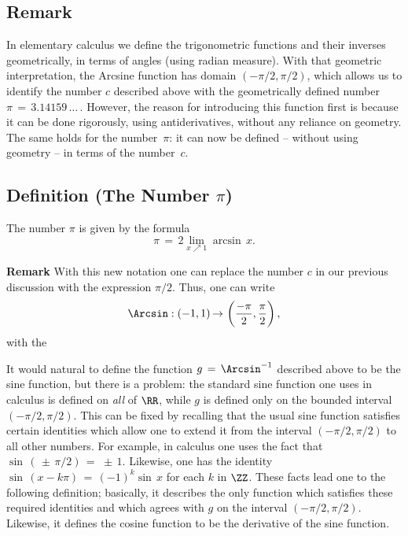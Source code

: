 \VV

             \subsection{\small{\bf Remark}}
            \label{RemrkE45.128AA}

\V

        In elementary calculus we define the trigonometric functions and their inverses geometrically, in terms of angles (using radian measure).
    With that geometric interpretation, the Arcsine function has domain $(-{\pi}/2, {\pi}/2)$,
    which allows us to identify the number $c$ described above with the geometrically defined number~${\pi} \,=\, 3.14159\,{\ldots}\,$.
    However, the reason for introducing this function first is because it can be done rigorously, using antiderivatives, without any reliance on geometry.
    The same holds for the number~${\pi}$: it can now be defined -- without using geometry -- in terms of the number~$c$.

\V

             \subsection{\small{\bf Definition} (The Number ${\pi}$)}
            \label{DefE45.128AAA}

        The number ${\pi}$ is given by the formula
        \begin{equation}
        \label{EqnE.84}
        {\pi} \,=\, 2\lim_{x {\nearrow}1} {\arcsin}\,x.
        \end{equation}

\V

        {\bf Remark} With this new notation one can replace the number $c$ in our previous discussion with the expression ${\pi}/2$.
    Thus, one can write
        \begin{displaymath}
        {\Arcsin}:(-1,1) \,{\rightarrow}\, \left(\frac{-{\pi}}{2},\frac{{\pi}}{2}\right),
        \end{displaymath}
    with the


\V

\VV

        It would natural to define the function $g \,=\, {\Arcsin}^{-1}$ described above to be the sine function, but there is a problem:
    the standard sine function one uses in calculus is defined on {\em all} of ${\RR}$,
    while $g$ is defined only on the bounded interval $(-{\pi}/2,{\pi}/2)$.
    This can be fixed by recalling that the usual sine function satisfies certain identities which allow one to extend it from the interval $(-{\pi}/2,{\pi}/2)$ to all other numbers.
    For example, in calculus one uses the fact that ${\sin}\,( \,{\pm}\, {\pi}/2) \,=\,  \,{\pm}\, 1$.
    Likewise, one has the identity ${\sin}\,(x-k{\pi}) \,=\, (-1)^{k}{\sin}\,x$ for each $k$ in ${\ZZ}$.
    These facts lead one to the following definition; basically, it describes the only function which satisfies these required identities and which agrees with $g$ on the interval $(-{\pi}/2,{\pi}/2)$.
    Likewise, it defines the cosine function to be the derivative of the sine function.


